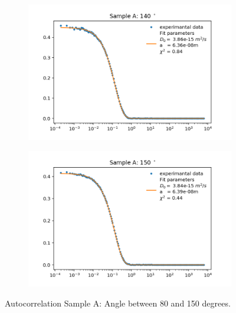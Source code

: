 \documentclass[]{article}
\begin{document}
\begin{figure}[!h]
\medskip
\begin{subfigure}{0.48\textwidth}
\includegraphics[width=\linewidth]{Plots/A/140.png}
\end{subfigure}
\begin{subfigure}[c]{0.48\linewidth}
\includegraphics[width=\linewidth]{Plots/A/150.png}
\end{subfigure}

\caption{Autocorrelation Sample A: Angle between 80 and 150 degrees.}
\end{figure}
\newpage
\end{document}
